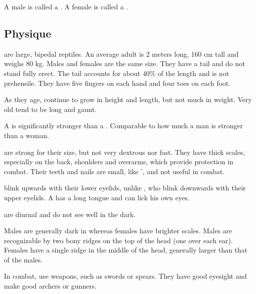 A male \scatha{} is called a \dax. 
A female is called a \sphyle. 









\subsection{Physique}
\Scathae{} are large, bipedal reptiles. An average adult \scatha{} is 2 meters long, 160 cm tall and weighs 80 kg. Males and females are the same size. They have a tail and do not stand fully erect. The tail accounts for about $40\%$ of the length and is not prehensile. They have five fingers on each hand and four toes on each foot. 

As they age, \scathae{} continue to grow in height and length, but not much in weight. Very old \scathae{} tend to be long and gaunt. 

A \scatha{} is significantly stronger than a \human. 
Comparable to how much a \human{} man is stronger than a woman. 

\Scathae{} are strong for their size, but not very dextrous nor fast. They have thick scales, especially on the back, shoulders and overarms, which provide protection in combat. Their teeth and nails are small, like \humans{}', and not useful in combat. 

\Scathae{} blink upwards with their lower eyelids, unlike \humans, who blink downwards with their upper eyelids. A \scatha{} has a long tongue and can lick his own eyes. 

\Scathae{} are diurnal and do not see well in the dark. 

Males are generally dark in \colour whereas females have brighter scales. Males are recognizable by two bony ridges on the top of the head (one over each ear). Females have a single ridge in the middle of the head, generally larger than that of the males. 

In combat, \scathae{} use weapons, such as swords or spears. They have good eyesight and make good archers or gunners. 





